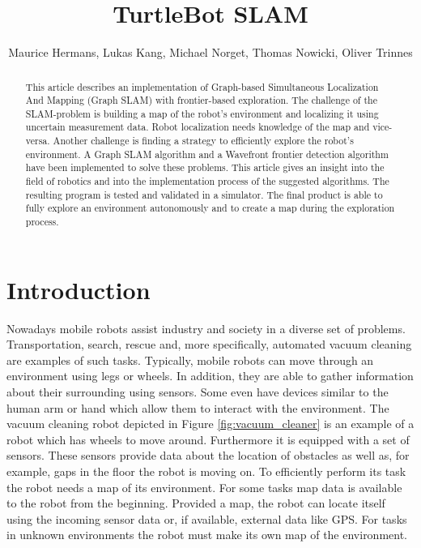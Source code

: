 \documentclass{ba-kecs}
\title{TurtleBot SLAM }
\author{Maurice Hermans, Lukas Kang, Michael Norget, Thomas Nowicki, Oliver Trinnes}
\begin{document}
\maketitle

\begin{abstract}
 This article describes an implementation of Graph-based Simultaneous Localization And Mapping (Graph SLAM) with frontier-based exploration. The challenge of the SLAM-problem is building a map of the robot's environment and localizing it using uncertain measurement data. Robot localization needs knowledge of the map and vice-versa. Another challenge is finding a strategy to efficiently explore the robot's environment. A Graph SLAM algorithm and a Wavefront frontier detection algorithm have been implemented to solve these problems. This article gives an insight into the field of robotics and into the implementation process of the suggested algorithms. The resulting program is tested and validated in a simulator. The final product is able to fully explore an environment autonomously and to create a map during the exploration process.
\end{abstract}

\section{Introduction}
\label{sec:intro}
Nowadays mobile robots assist industry and society in a diverse set of problems. Transportation, search, rescue and, more specifically, automated vacuum cleaning are examples of such tasks. Typically, mobile robots can move through an environment using legs or wheels. In addition, they are able to gather information about their surrounding using sensors. Some even have devices similar to the human arm or hand which allow them to interact with the environment. The vacuum cleaning robot depicted in Figure \ref{fig:vacuum_cleaner} is an example of a robot which has wheels to move around. Furthermore it is equipped with a set of sensors. These sensors provide data about the location of obstacles as well as, for example, gaps in the floor the robot is moving on. To efficiently perform its task the robot needs a map of its environment. For some tasks map data is available to the robot from the beginning. Provided a map, the robot can locate itself using the incoming sensor data or, if available, external data like GPS. For tasks in unknown environments the robot must make its own map of the environment.
\end{document}
